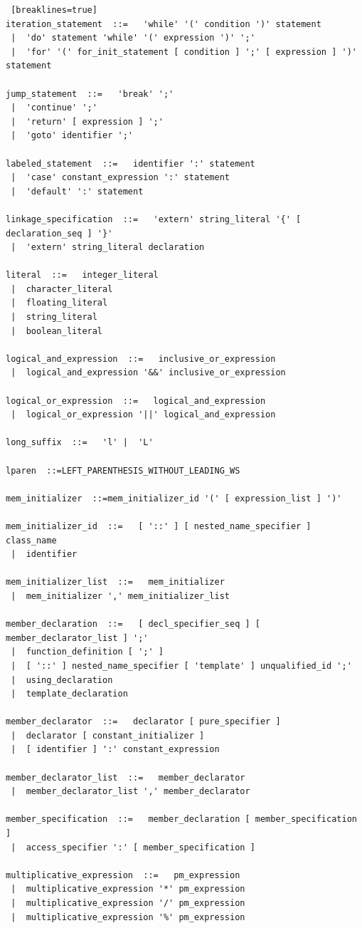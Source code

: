 \documentclass[11pt]{book}
\begin{document}
\begin{lstlisting} [breaklines=true]
iteration_statement  ::=   'while' '(' condition ')' statement
 |  'do' statement 'while' '(' expression ')' ';'
 |  'for' '(' for_init_statement [ condition ] ';' [ expression ] ')' statement

jump_statement  ::=   'break' ';'
 |  'continue' ';'
 |  'return' [ expression ] ';'
 |  'goto' identifier ';'

labeled_statement  ::=   identifier ':' statement
 |  'case' constant_expression ':' statement
 |  'default' ':' statement

linkage_specification  ::=   'extern' string_literal '{' [ declaration_seq ] '}'
 |  'extern' string_literal declaration

literal  ::=   integer_literal
 |  character_literal
 |  floating_literal
 |  string_literal
 |  boolean_literal

logical_and_expression  ::=   inclusive_or_expression
 |  logical_and_expression '&&' inclusive_or_expression

logical_or_expression  ::=   logical_and_expression
 |  logical_or_expression '||' logical_and_expression

long_suffix  ::=   'l' |  'L'

lparen  ::=LEFT_PARENTHESIS_WITHOUT_LEADING_WS

mem_initializer  ::=mem_initializer_id '(' [ expression_list ] ')'

mem_initializer_id  ::=   [ '::' ] [ nested_name_specifier ] class_name
 |  identifier

mem_initializer_list  ::=   mem_initializer
 |  mem_initializer ',' mem_initializer_list

member_declaration  ::=   [ decl_specifier_seq ] [ member_declarator_list ] ';'
 |  function_definition [ ';' ]
 |  [ '::' ] nested_name_specifier [ 'template' ] unqualified_id ';'
 |  using_declaration
 |  template_declaration

member_declarator  ::=   declarator [ pure_specifier ]
 |  declarator [ constant_initializer ]
 |  [ identifier ] ':' constant_expression

member_declarator_list  ::=   member_declarator
 |  member_declarator_list ',' member_declarator

member_specification  ::=   member_declaration [ member_specification ]
 |  access_specifier ':' [ member_specification ]

multiplicative_expression  ::=   pm_expression
 |  multiplicative_expression '*' pm_expression
 |  multiplicative_expression '/' pm_expression
 |  multiplicative_expression '%' pm_expression


\end{lstlisting}
\end{document}
